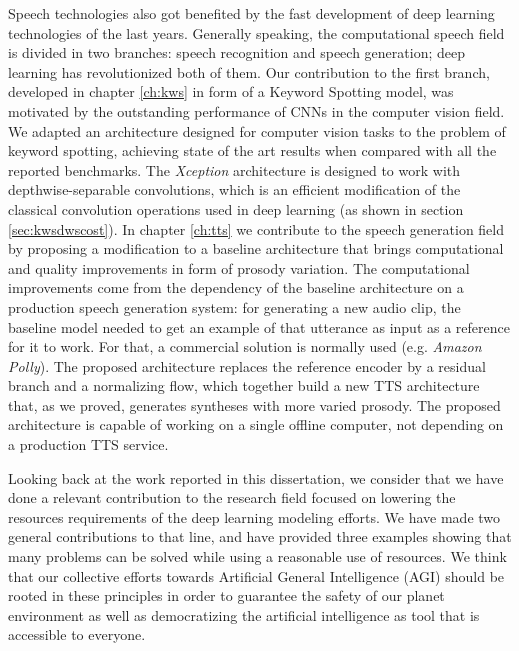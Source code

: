 Speech technologies also got benefited by the fast development of deep learning technologies of the last years. Generally speaking, the computational speech field is divided in two branches: speech recognition and speech generation; deep learning has revolutionized both of them. Our contribution to the first branch, developed in chapter \ref{ch:kws} in form of a Keyword Spotting model, was motivated by the outstanding performance of CNNs in the computer vision field. We adapted an architecture designed for computer vision tasks to the problem of keyword spotting, achieving state of the art results when compared with all the reported benchmarks. The \textit{Xception} architecture is designed to work with depthwise-separable convolutions, which is an efficient modification of the classical convolution operations used in deep learning (as shown in section \ref{sec:kwsdwscost}). In chapter \ref{ch:tts} we contribute to the speech generation field by proposing a modification to a baseline architecture that brings computational and quality improvements in form of prosody variation. The computational improvements come from the dependency of the baseline architecture on a production speech generation system: for generating a new audio clip, the baseline model needed to get an example of that utterance as input as a reference for it to work. For that, a commercial solution is normally used (e.g. \textit{Amazon Polly}). The proposed architecture replaces the reference encoder by a residual branch and a normalizing flow, which together build a new TTS architecture that, as we proved, generates syntheses with more varied prosody. The proposed architecture is capable of working on a single offline computer, not depending on a production TTS service.

Looking back at the work reported in this dissertation, we consider that we have done a relevant contribution to the research field focused on lowering the resources requirements of the deep learning modeling efforts. We have made two general contributions to that line, and have provided three examples showing that many problems can be solved while using a reasonable use of resources. We think that our collective efforts towards Artificial General Intelligence (AGI) should be rooted in these principles in order to guarantee the safety of our planet environment as well as democratizing the artificial intelligence as tool that is accessible to everyone. 


